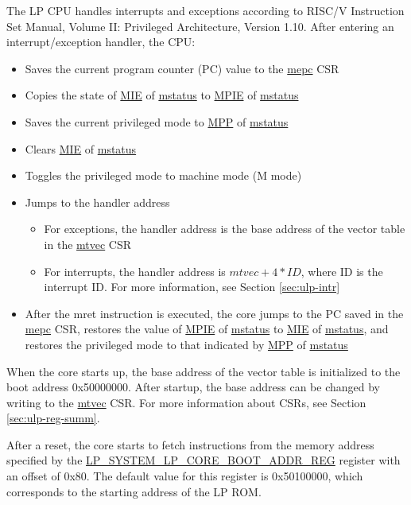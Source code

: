 \documentclass[main\_\_EN.tex]{subfiles}
\begin{document}
The LP CPU handles interrupts and exceptions according to RISC\-/V Instruction Set Manual, Volume II: Privileged Architecture, Version 1.10. After entering an interrupt/exception handler, the CPU:
\begin{itemize}
    \item Saves the current program counter (PC) value to the \hyperref[regdesc:LPMEPC]{mepc} CSR
    \item Copies the state of \hyperref[fielddesc:LPMSTATUSMIE]{MIE} of \hyperref[regdesc:LPMSTATUS]{mstatus} to \hyperref[fielddesc:LPMSTATUSMPIE]{MPIE} of \hyperref[regdesc:LPMSTATUS]{mstatus}
    \item Saves the current privileged mode to \hyperref[fielddesc:LPMSTATUSMPP]{MPP} of \hyperref[regdesc:LPMSTATUS]{mstatus}
    \item Clears \hyperref[fielddesc:LPMSTATUSMIE]{MIE} of \hyperref[regdesc:LPMSTATUS]{mstatus}
    \item Toggles the privileged mode to machine mode (M mode)
    \item Jumps to the handler address
        \begin{itemize}
            \item For exceptions, the handler address is the base address of the vector table in the \hyperref[regdesc:LPMTVEC]{mtvec} CSR
            \item For interrupts, the handler address is $mtvec + 4*ID$, where ID is the interrupt ID. For more information, see Section \ref{sec:ulp-intr}
        \end{itemize}
    \item After the mret instruction is executed, the core jumps to the PC saved in the \hyperref[regdesc:LPMEPC]{mepc} CSR, restores the value of \hyperref[fielddesc:LPMSTATUSMPIE]{MPIE} of \hyperref[regdesc:LPMSTATUS]{mstatus} to \hyperref[fielddesc:LPMSTATUSMIE]{MIE} of \hyperref[regdesc:LPMSTATUS]{mstatus}, and restores the privileged mode to that indicated by \hyperref[fielddesc:LPMSTATUSMPP]{MPP} of \hyperref[regdesc:LPMSTATUS]{mstatus}
\end{itemize}

When the core starts up, the base address of the vector table is initialized to the boot address 0x50000000. After startup, the base address can be changed by writing to the \hyperref[regdesc:LPMTVEC]{mtvec} CSR. For more information about CSRs, see Section \ref{sec:ulp-reg-summ}.

After a reset, the core starts to fetch instructions from the memory address specified by the \hyperref[regdesc:LPSYSTEMLPCOREBOOTADDRREG]{LP\_SYSTEM\_LP\_CORE\_BOOT\_ADDR\_REG} register with an offset of 0x80. The default value for this register is 0x50100000, which corresponds to the starting address of the LP ROM.
\end{document}
